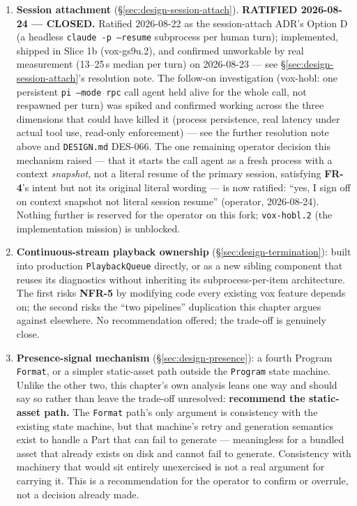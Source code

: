 \documentclass[a4paper,11pt]{report}
\newcommand{\fr}[1]{\textbf{FR-#1}}
\newcommand{\nfr}[1]{\textbf{NFR-#1}}
\begin{document}
\begin{enumerate}
  \item \textbf{Session attachment} (\S\ref{sec:design-session-attach}).
    \textbf{RATIFIED 2026-08-24 --- CLOSED.} Ratified 2026-08-22 as the
    session-attach ADR's Option D (a headless \texttt{claude -p --resume}
    subprocess per human turn); implemented, shipped in Slice 1b
    (vox-gs9u.2), and confirmed unworkable by real measurement
    (13--25\,s median per turn) on 2026-08-23 --- see
    \S\ref{sec:design-session-attach}'s resolution note. The follow-on
    investigation (vox-hobl: one persistent \texttt{pi --mode rpc} call
    agent held alive for the whole call, not respawned per turn) was
    spiked and confirmed working across the three dimensions that could
    have killed it (process persistence, real latency under actual tool
    use, read-only enforcement) --- see the further resolution note above
    and \texttt{DESIGN.md} DES-066. The one remaining operator decision
    this mechanism raised --- that it starts the call agent as a fresh
    process with a context \emph{snapshot}, not a literal resume of the
    primary session, satisfying \fr{4}'s intent but not its original
    literal wording --- is now ratified: ``yes, I sign off on context
    snapshot not literal session resume'' (operator, 2026-08-24). Nothing
    further is reserved for the operator on this fork; \texttt{vox-hobl.2}
    (the implementation mission) is unblocked.
  \item \textbf{Continuous-stream playback ownership}
    (\S\ref{sec:design-termination}): built into production
    \texttt{PlaybackQueue} directly, or as a new sibling component that
    reuses its diagnostics without inheriting its subprocess-per-item
    architecture. The first risks \nfr{5} by modifying code every
    existing vox feature depends on; the second risks the ``two
    pipelines'' duplication this chapter argues against elsewhere. No
    recommendation offered; the trade-off is genuinely close.
  \item \textbf{Presence-signal mechanism}
    (\S\ref{sec:design-presence}): a fourth Program \texttt{Format}, or a
    simpler static-asset path outside the \texttt{Program} state
    machine. Unlike the other two, this chapter's own analysis leans one
    way and should say so rather than leave the trade-off unresolved:
    \textbf{recommend the static-asset path.} The \texttt{Format} path's
    only argument is consistency with the existing state machine, but
    that machine's retry and generation semantics exist to handle a Part
    that can fail to generate --- meaningless for a bundled asset that
    already exists on disk and cannot fail to generate. Consistency with
    machinery that would sit entirely unexercised is not a real argument
    for carrying it. This is a recommendation for the operator to
    confirm or overrule, not a decision already made.
\end{enumerate}
\end{document}
